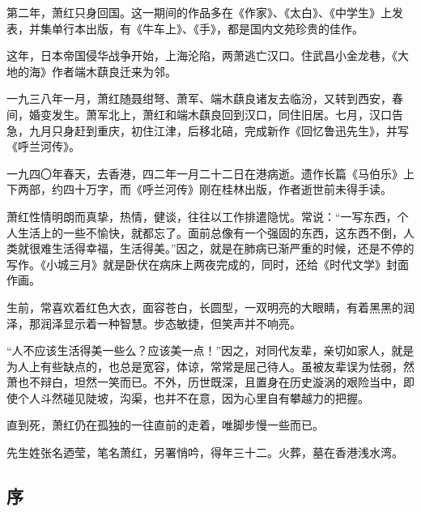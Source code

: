 \par 第二年，萧红只身回国。这一期间的作品多在《作家》、《太白》、《中学生》上发表，并集单行本出版，有《牛车上》、《手》，都是国内文苑珍贵的佳作。
\par 这年，日本帝国侵华战争开始，上海沦陷，两萧逃亡汉口。住武昌小金龙巷，《大地的海》作者端木蕻良迁来为邻。
\par 一九三八年一月，萧红随聂绀弩、萧军、端木蕻良诸友去临汾，又转到西安，春间，婚变发生。萧军北上，萧红和端木蕻良回到汉口，同住旧居。七月，汉口告急，九月只身赶到重庆，初住江津，后移北碚，完成新作《回忆鲁迅先生》，并写《呼兰河传》。
\par 一九四〇年春天，去香港，四二年一月二十二日在港病逝。遗作长篇《马伯乐》上下两部，约四十万字，而《呼兰河传》刚在桂林出版，作者逝世前未得手读。
\par 萧红性情明朗而真挚，热情，健谈，往往以工作排遣隐忧。常说：“一写东西，个人生活上的一些不愉快，就都忘了。面前总像有一个强固的东西，这东西不倒，人类就很难生活得幸福，生活得美。”因之，就是在肺病已渐严重的时候，还是不停的写作。《小城三月》就是卧伏在病床上两夜完成的，同时，还给《时代文学》封面作画。
\par 生前，常喜欢着红色大衣，面容苍白，长圆型，一双明亮的大眼睛，有着黑黑的润泽，那润泽显示着一种智慧。步态敏捷，但笑声并不响亮。
\par “人不应该生活得美一些么？应该美一点！”因之，对同代友辈，亲切如家人，就是为人上有些缺点的，也总是宽容，体谅，常常是屈己待人。虽被友辈误为怯弱，然萧也不辩白，坦然一笑而已。不外，历世既深，且置身在历史漩涡的艰险当中，即使个人斗然碰见陡坡，沟渠，也并不在意，因为心里自有攀越力的把握。
\par 直到死，萧红仍在孤独的一往直前的走着，唯脚步慢一些而已。
\par 先生姓张名迺莹，笔名萧红，另署悄吟，得年三十二。火葬，墓在香港浅水湾。
\par {}
\par {}
\par {}



\subsection{序}

